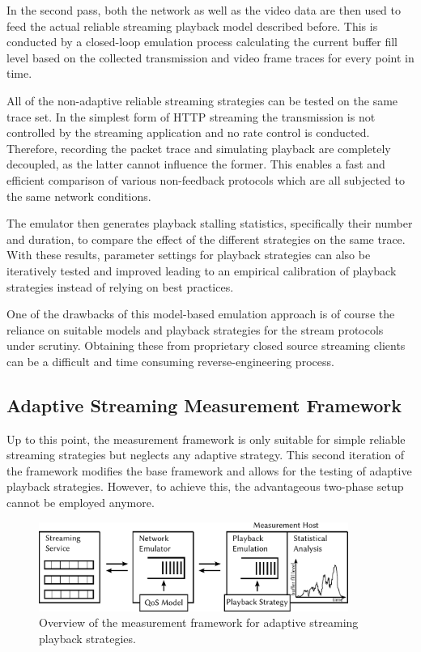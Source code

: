 In the second pass, both the network as well as the video data are then used to feed the actual reliable streaming playback model described before. This is conducted by a closed-loop emulation process calculating the current buffer fill level based on the collected transmission and video frame traces for every point in time. 

All of the non-adaptive reliable streaming strategies can be tested on the same trace set. In the simplest form of \gls{HTTP} streaming the transmission is not controlled by the streaming application and no rate control is conducted. Therefore, recording the packet trace and simulating playback are completely decoupled, as the latter cannot influence the former. This enables a fast and efficient comparison of various non-feedback protocols which are all subjected to the same network conditions.

The emulator then generates playback stalling statistics, specifically their number and duration, to compare the effect of the different strategies on the same trace. With these results, parameter settings for playback strategies can also be iteratively tested and improved leading to an empirical calibration of playback strategies instead of relying on best practices.

One of the drawbacks of this model-based emulation approach is of course the reliance on suitable models and playback strategies for the stream protocols under scrutiny. Obtaining these from proprietary closed source streaming clients can be a difficult and time consuming reverse-engineering process.


\subsection{Adaptive Streaming Measurement Framework}

Up to this point, the measurement framework is only suitable for simple reliable streaming strategies but neglects any adaptive strategy. This second iteration of the framework modifies the base framework and allows for the testing of adaptive playback strategies. However, to achieve this, the advantageous two-phase setup cannot be employed anymore.

\begin{figure}[htb]
	\centering
	\includegraphics[width=0.9\textwidth]{images/feedback-measurement-model.pdf}
	\caption{Overview of the measurement framework for adaptive streaming playback strategies.}
\label{c3:fig:framework-feedback}
\end{figure}


